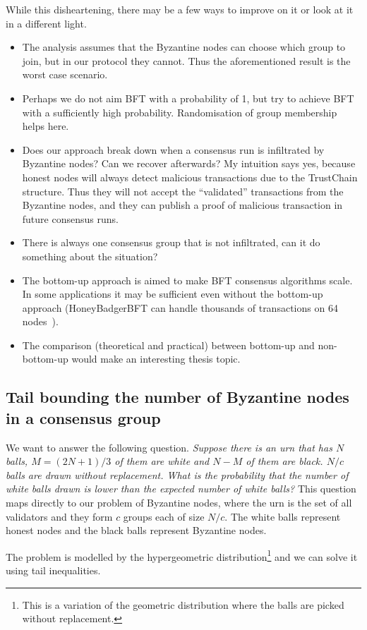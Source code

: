 While this disheartening, there may be a few ways to improve on it or look at it
in a different light.
\begin{itemize}
\item The analysis assumes that the Byzantine nodes can choose which group to
  join, but in our protocol they cannot. Thus the aforementioned result is the
  worst case scenario.
\item Perhaps we do not aim BFT with a probability of 1, but try to achieve BFT
  with a sufficiently high probability. Randomisation of group membership helps
  here.
\item Does our approach break down when a consensus run is infiltrated by
  Byzantine nodes? Can we recover afterwards? My intuition says yes, because
  honest nodes will always detect malicious transactions due to the TrustChain
  structure. Thus they will not accept the ``validated'' transactions from the
  Byzantine nodes, and they can publish a proof of malicious transaction in
  future consensus runs.
\item There is always one consensus group that is not infiltrated, can it do
  something about the situation?
\item The bottom-up approach is aimed to make BFT consensus algorithms scale. In
  some applications it may be sufficient even without the bottom-up approach
  (HoneyBadgerBFT can handle thousands of transactions on 64
  nodes~\cite{miller2016honey}).
\item The comparison (theoretical and practical) between bottom-up and
  non-bottom-up would make an interesting thesis topic.
\end{itemize}

\subsection{Tail bounding the number of Byzantine nodes in a consensus group}
We want to answer the following question. \emph{Suppose there is an urn that has
  $N$ balls, $M = (2N+1)/3$ of them are white and $N - M$ of them are black.
  $N/c$ balls are drawn without replacement. What is the probability that the
  number of white balls drawn is lower than the expected number of white balls?}
This question maps directly to our problem of Byzantine nodes, where the urn is
the set of all validators and they form $c$ groups each of size $N/c$. The white
balls represent honest nodes and the black balls represent Byzantine nodes.

The problem is modelled by the hypergeometric distribution\footnote{This is a
  variation of the geometric distribution where the balls are picked without
  replacement.} and we can solve it using tail inequalities.

